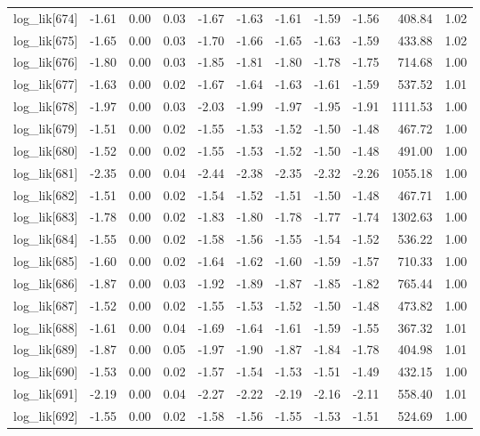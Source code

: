 \begin{table}[ht]
\begin{tabular}{rrrrrrrrrrr}
  log\_lik[674] & -1.61 & 0.00 & 0.03 & -1.67 & -1.63 & -1.61 & -1.59 & -1.56 & 408.84 & 1.02 \\ 
  log\_lik[675] & -1.65 & 0.00 & 0.03 & -1.70 & -1.66 & -1.65 & -1.63 & -1.59 & 433.88 & 1.02 \\ 
  log\_lik[676] & -1.80 & 0.00 & 0.03 & -1.85 & -1.81 & -1.80 & -1.78 & -1.75 & 714.68 & 1.00 \\ 
  log\_lik[677] & -1.63 & 0.00 & 0.02 & -1.67 & -1.64 & -1.63 & -1.61 & -1.59 & 537.52 & 1.01 \\ 
  log\_lik[678] & -1.97 & 0.00 & 0.03 & -2.03 & -1.99 & -1.97 & -1.95 & -1.91 & 1111.53 & 1.00 \\ 
  log\_lik[679] & -1.51 & 0.00 & 0.02 & -1.55 & -1.53 & -1.52 & -1.50 & -1.48 & 467.72 & 1.00 \\ 
  log\_lik[680] & -1.52 & 0.00 & 0.02 & -1.55 & -1.53 & -1.52 & -1.50 & -1.48 & 491.00 & 1.00 \\ 
  log\_lik[681] & -2.35 & 0.00 & 0.04 & -2.44 & -2.38 & -2.35 & -2.32 & -2.26 & 1055.18 & 1.00 \\ 
  log\_lik[682] & -1.51 & 0.00 & 0.02 & -1.54 & -1.52 & -1.51 & -1.50 & -1.48 & 467.71 & 1.00 \\ 
  log\_lik[683] & -1.78 & 0.00 & 0.02 & -1.83 & -1.80 & -1.78 & -1.77 & -1.74 & 1302.63 & 1.00 \\ 
  log\_lik[684] & -1.55 & 0.00 & 0.02 & -1.58 & -1.56 & -1.55 & -1.54 & -1.52 & 536.22 & 1.00 \\ 
  log\_lik[685] & -1.60 & 0.00 & 0.02 & -1.64 & -1.62 & -1.60 & -1.59 & -1.57 & 710.33 & 1.00 \\ 
  log\_lik[686] & -1.87 & 0.00 & 0.03 & -1.92 & -1.89 & -1.87 & -1.85 & -1.82 & 765.44 & 1.00 \\ 
  log\_lik[687] & -1.52 & 0.00 & 0.02 & -1.55 & -1.53 & -1.52 & -1.50 & -1.48 & 473.82 & 1.00 \\ 
  log\_lik[688] & -1.61 & 0.00 & 0.04 & -1.69 & -1.64 & -1.61 & -1.59 & -1.55 & 367.32 & 1.01 \\ 
  log\_lik[689] & -1.87 & 0.00 & 0.05 & -1.97 & -1.90 & -1.87 & -1.84 & -1.78 & 404.98 & 1.01 \\ 
  log\_lik[690] & -1.53 & 0.00 & 0.02 & -1.57 & -1.54 & -1.53 & -1.51 & -1.49 & 432.15 & 1.00 \\ 
  log\_lik[691] & -2.19 & 0.00 & 0.04 & -2.27 & -2.22 & -2.19 & -2.16 & -2.11 & 558.40 & 1.01 \\ 
  log\_lik[692] & -1.55 & 0.00 & 0.02 & -1.58 & -1.56 & -1.55 & -1.53 & -1.51 & 524.69 & 1.00 \\ 

\end{tabular}
\end{table}
